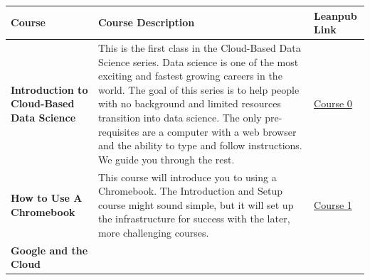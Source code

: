 \documentclass[]{book}
\begin{document}
\begin{longtable}[]{@{}lll@{}}
\toprule
\begin{minipage}[b]{0.26\columnwidth}\raggedright
Course\strut
\end{minipage} & \begin{minipage}[b]{0.54\columnwidth}\raggedright
Course Description\strut
\end{minipage} & \begin{minipage}[b]{0.12\columnwidth}\raggedright
Leanpub Link\strut
\end{minipage}\tabularnewline
\midrule
\endhead
\begin{minipage}[t]{0.26\columnwidth}\raggedright
\textbf{Introduction to Cloud-Based Data Science}\strut
\end{minipage} & \begin{minipage}[t]{0.54\columnwidth}\raggedright
This is the first class in the Cloud-Based Data Science series. Data science is one of the most exciting and fastest growing careers in the world. The goal of this series is to help people with no background and limited resources transition into data science. The only pre-requisites are a computer with a web browser and the ability to type and follow instructions. We guide you through the rest.\strut
\end{minipage} & \begin{minipage}[t]{0.12\columnwidth}\raggedright
\href{https://leanpub.com/universities/courses/jhu/cbds-intro}{Course 0}\strut
\end{minipage}\tabularnewline
\begin{minipage}[t]{0.26\columnwidth}\raggedright
\textbf{How to Use A Chromebook}\strut
\end{minipage} & \begin{minipage}[t]{0.54\columnwidth}\raggedright
This course will introduce you to using a Chromebook. The Introduction and Setup course might sound simple, but it will set up the infrastructure for success with the later, more challenging courses.\strut
\end{minipage} & \begin{minipage}[t]{0.12\columnwidth}\raggedright
\href{https://leanpub.com/universities/courses/jhu/cbds-chromebook}{Course 1}\strut
\end{minipage}\tabularnewline
\begin{minipage}[t]{0.26\columnwidth}\raggedright
\textbf{Google and the Cloud}\strut
\end{minipage} & \begin{minipage}[t]{0.54\columnwidth}\raggedright

\end{minipage}
\end{longtable}
\end{document}
